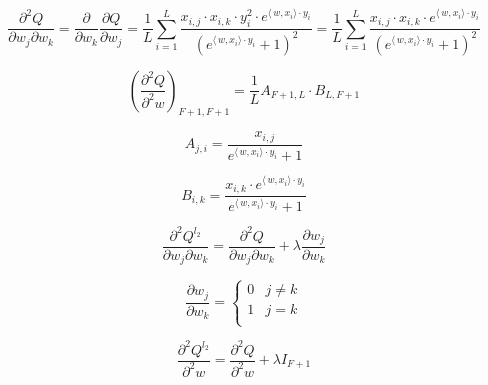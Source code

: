\documentclass[12pt]{article}
\begin{document}
$$\frac{\partial^2 Q}{\partial w_j \partial w_k} = \frac{\partial}{\partial w_k} \frac{\partial Q}{\partial w_j} = \frac{1}{L}\sum\limits_{i = 1}^{L} \frac{x_{i, j} \cdot x_{i, k} \cdot y_i^2 \cdot e^{\langle\,w,x_i\rangle \cdot y_i}}{(e^{\langle\,w,x_i\rangle \cdot y_i} + 1)^2} = \frac{1}{L}\sum\limits_{i = 1}^{L} \frac{x_{i, j} \cdot x_{i, k} \cdot e^{\langle\,w,x_i\rangle \cdot y_i}}{(e^{\langle\,w,x_i\rangle \cdot y_i} + 1)^2}$$

\[ 
\left( \frac{\partial^2 Q}{\partial^2 w} \right)_{F+1, F+1} =\frac{1}{L} A_{F+1, L} \cdot B_{L, F+1}
\]

$$A_{j, i} = \frac{x_{i, j}}{e^{\langle\,w,x_i\rangle \cdot y_i} + 1}$$

$$B_{i, k} = \frac{x_{i, k} \cdot e^{\langle\,w,x_i\rangle \cdot y_i}}{e^{\langle\,w,x_i\rangle \cdot y_i} + 1}$$

$$\frac{\partial^2 Q^{l_2}}{\partial w_j \partial w_k} = \frac{\partial^2 Q}{\partial w_j \partial w_k} + \lambda \frac{\partial w_j}{\partial w_k}$$

\[\frac{\partial w_j}{\partial w_k} = \begin{cases} 
      0 & j \neq k\\
     1 & j = k \\
   \end{cases}
\]


$$\frac{\partial^2 Q^{l_2}}{\partial^2 w} = \frac{\partial^2 Q}{\partial^2 w} + \lambda I_{F+1}$$
\end{document}
